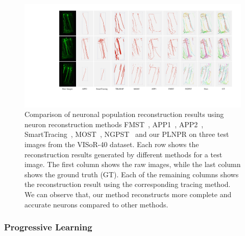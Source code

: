 \begin{figure}[t]
	\centering
	\includegraphics[width=1\textwidth]{./Illustrations/iteration3.pdf}
	\caption{Comparison of neuronal population reconstruction results using neuron reconstruction methods FMST~\cite{Yang2018}, APP1~\cite{Peng2011}, APP2~\cite{Xiao2013}, SmartTracing~\cite{Chen2015}, MOST~\cite{Wu2014}, NGPST~\cite{Quan2015} and our PLNPR on three test images from the VISoR-40 dataset.
	Each row shows the reconstruction results generated by different methods for a test image. The first column shows the raw images, while the last column shows the ground truth (GT). Each of the remaining columns shows the reconstruction result using the corresponding tracing method. We can observe that, our method reconstructs more complete and accurate neurons compared to other methods.
	}
	\label{fig:compare_VISoR}
\end{figure}

\subsubsection{Progressive Learning}

